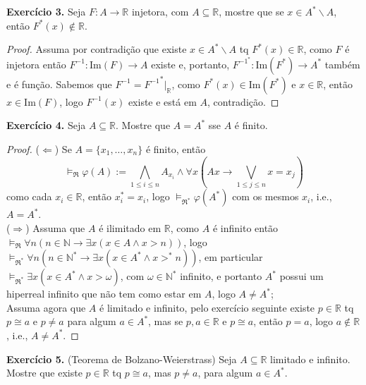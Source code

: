 \documentclass[11pt]{article}
\newcommand{\mf}[1]{\mathfrak{#1}}
\newcommand{\mbb}[1]{\mathbb{#1}}
\newcommand{\rp}[1]{{\left(#1\right)}}
\begin{document}
\begin{shaded}
\textbf{Exercício 3.} Seja $F:A\to\mbb{R}$ injetora, com $A\subseteq\mbb{R}$, mostre que se $x\in A^*\backslash A$, então $F^*(x)\notin\mbb{R}$.
\end{shaded}

\begin{proof}
    Assuma por contradição que existe $x\in A^*\backslash A$ tq $F^*(x)\in\mbb{R}$, como $F$ é injetora então $F^{-1}:\text{Im}(F)\to A$ existe e, portanto, $F^{{-1}^*}:\text{Im}(F^*)\to A^*$ também e é função. Sabemos que $F^{-1}={F^{-1}}^*\vert_{\mbb{R}}$, como $F^*(x)\in\text{Im}(F^*)$ e $x\in\mbb{R}$, então $x\in\text{Im}(F)$, logo $F^{-1}(x)$ existe e está em $A$, contradição.
\end{proof}

\begin{shaded}
\textbf{Exercício 4.} Seja $A\subseteq\mbb{R}$. Mostre que $A=A^*$ sse $A$ é finito.
\end{shaded}

\begin{proof}
    ($\Leftarrow$) Se $A=\{x_1,\dots,x_n\}$ é finito, então
    $$\vDash_\mf{R}\varphi(A):=\bigwedge_{1\leq i\leq n} A_{x_i}\wedge\forall x\rp{Ax\to \bigvee_{1\leq j\leq n}x=x_j}$$
    como cada $x_i\in\mbb{R}$, então $x_i^*=x_i$, logo $\vDash_{\mf{R}^*}\varphi(A^*)$ com os mesmos $x_i$, i.e., $A=A^*$.\\
    ($\Rightarrow$) Assuma que $A$ é ilimitado em $\mbb{R}$, como $A$ é infinito então $\vDash_\mf{R}\forall n(n\in\mbb{N}\to\exists x(x\in A\wedge x>n))$, logo $\vDash_{\mf{R}^*}\forall n(n\in\mbb{N}^*\to\exists x(x\in A^*\wedge x>^*n))$, em particular $\vDash_{\mf{R}^*}\exists x(x\in A^*\wedge x>\omega)$, com $\omega\in\mbb{N}^*$ infinito, e portanto $A^*$ possui um hiperreal infinito que não tem como estar em $A$, logo $A\neq A^*$;\\
    Assuma agora que $A$ é limitado e infinito, pelo exercício seguinte existe $p\in\mbb{R}$ tq $p\cong a$ e $p\neq a$ para algum $a\in A^*$, mas se $p,a\in\mbb{R}$ e $p\cong a$, então $p=a$, logo $a\notin\mbb{R}$, i.e., $A\neq A^*$.
\end{proof}

\begin{shaded}
\textbf{Exercício 5.} (Teorema de Bolzano-Weierstrass) Seja $A\subseteq\mbb{R}$ limitado e infinito. Mostre que existe $p\in\mbb{R}$ tq $p\cong a$, mas $p\neq a$, para algum $a\in A^*$.
\end{shaded}
\end{document}
